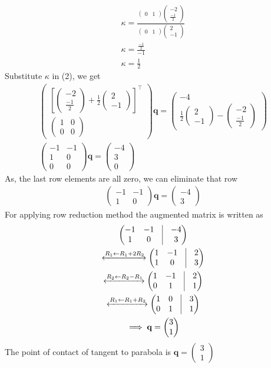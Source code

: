 \documentclass[a4paper,10pt]{report}
\newcommand{\myvec}[1]{\ensuremath{\begin{pmatrix}#1\end{pmatrix}}}
\let\vec\mathbf
\providecommand{\sbrak}[1]{\ensuremath{{}\left[#1\right]}}
\begin{document}
\begin{multicols}{2}
\begin{gather*}
\kappa=\frac{\myvec{0&1}\myvec{-2\\ \frac{-1}{2}}}{\myvec{0&1}\myvec{2\\-1}}\\
\kappa=\frac{\frac{-1}{2}}{-1}\\
\kappa=\frac{1}{2}
\end{gather*}
Substitute $\kappa$ in (2), we get
\begin{gather*}
\myvec{\sbrak{\myvec{-2\\\frac{-1}{2}}+\frac{1}{2}\myvec{2\\-1}}^{\top} \\ \myvec{1&0\\0&0}}\vec{q} = \myvec{-4 \\ \frac{1}{2}\myvec{2\\-1}-\myvec{-2\\\frac{-1}{2}}}\\
\myvec{-1&-1 \\ 1&0 \\ 0&0}\vec{q}=\myvec{-4 \\ 3 \\ 0}
\end{gather*}
As, the last row elements are all zero, we can eliminate that row
\begin{gather*}
\myvec{-1&-1 \\ 1&0}\vec{q} = \myvec{-4\\3}
\end{gather*}
For applying row reduction method the augmented matrix is written as
\begin{gather*}
  \myvec{
                -1&-1&\vrule&-4\\
	        1&0&\vrule&3}\\
  \xleftrightarrow[]{R_1 \leftarrow R_1+ 2R_2}
     \myvec{
	         1&-1&\vrule&2\\
	         1&0&\vrule&3}
      \\
 \xleftrightarrow[]{R_2 \leftarrow R_2 - R_1}
     \myvec{
	         1&-1&\vrule&2\\
	         0&1&\vrule&1}
      \\
 \xleftrightarrow[]{R_1 \leftarrow R_1 + R_2}
     \myvec{
	         1&0&\vrule&3\\
	         0&1&\vrule&1}
      \\ \implies \vec{q}=\myvec{3\\1}
\end{gather*}
The point of contact of tangent to parabola is $\vec{q}=\myvec{3\\1}$


\end{multicols}
\end{document}
